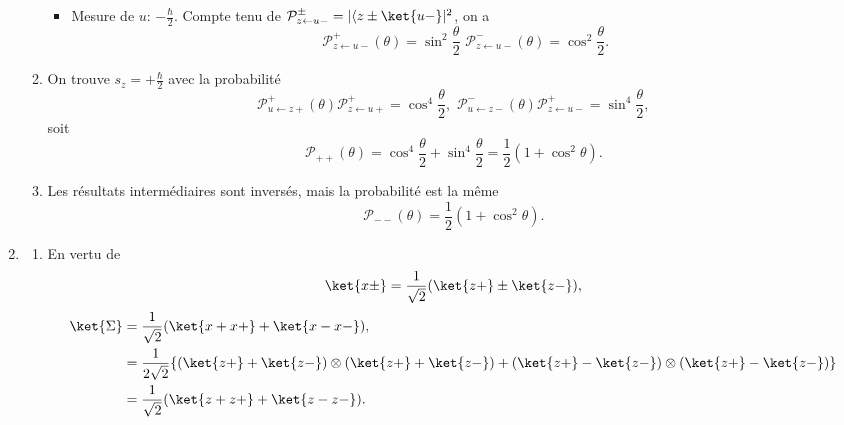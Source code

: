 \begin{enumerate}
\begin{enumerate}
\begin{itemize}
     \item Mesure de $u$: $-\frac{\hbar}{2}$. Compte tenu de 
$\mathcal{P}^{\pm}_{z\leftarrow u-} =|\langle z\pm\ket{u-}|^2$, on a
\begin{equation}
\mathcal{P}^{+}_{z\leftarrow u-}(\theta)=\sin^2\frac{\theta}{2}\,\,\mathcal 
{P}^{-}_{z\leftarrow u-}(\theta)=\cos^2\frac{\theta}{2}.
     \end{equation}
       \end{itemize}

\item On trouve $s_z=+\frac{\hbar}{2}$ avec la probabilité
\begin{equation}
\mathcal{P}^{+}_{u\leftarrow z+}(\theta)\mathcal{P}^{+}_{z\leftarrow u+} 
=\cos^4\frac{\theta}{2},\,\, 
 \mathcal{P}^{-}_{u\leftarrow z-}(\theta)\mathcal{P}^{+}_{z\leftarrow u-} 
=\sin^4\frac{\theta}{2},                           
\end{equation}
soit
\begin{equation}
  \mathcal{P}_{++}(\theta) =\cos^4\frac{\theta}{2}+\sin^4\frac{\theta}{2} 
=\frac{1}{2}(1+\cos^2\theta). 
\end{equation}

\item Les résultats intermédiaires sont inversés, mais la probabilité est la
même
\begin{equation}
 \mathcal{P}_{--}(\theta)=\frac{1}{2}(1+\cos^2\theta).
\end{equation}

\end{enumerate}

\item 
\begin{enumerate}
 \item En vertu de
 \begin{equation}
  \ket{x\pm}=\frac{1}{\sqrt{2}}(\ket{z+}\pm\ket{z-}),
 \end{equation}
 \begin{align}
 \ket{\Sigma}&=\frac{1}{\sqrt{2}}(\ket{x+x+}+\ket{x-x-}),\label{eq:Sigma1}\\
 &=\frac{1}{2\sqrt{2}}\lbrace(\ket{z+}+\ket{z-})\otimes(\ket{z+}+\ket{z-}
)+(\ket{ z+ } -\ket{z-})\otimes(\ket{z+}-\ket{z-})\rbrace\\
&=\frac{1}{\sqrt{2}}(\ket{z+z+}+\ket{z-z-}).\label{eq:Sigma2}
\end{align}


\end{enumerate}
\end{enumerate}
